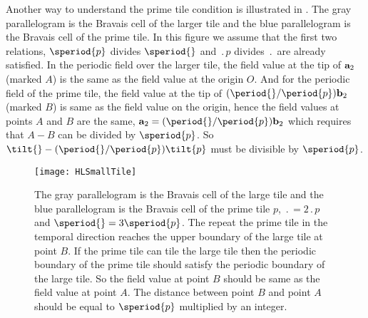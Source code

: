 \begin{description}
{Another way to understand the prime tile condition is illustrated in
. The gray parallelogram is the Bravais cell of
the larger tile and the blue parallelogram is the Bravais cell of the
prime tile. In this figure we assume that the first two relations,
$\speriod{p}$ divides $\speriod{}$ and $\period{p}$ divides $\period{}$
are already satisfied. In the periodic field over the larger tile, the
field value at the tip of  ${\bf a}_2$ (marked $A$) is the same as the
field value at the origin $O$. And for the periodic field of the prime
tile, the field value at the tip of  $(\period{}/\period{p}){\bf b}_2$
(marked $B$) is same as the field value on the origin, hence the field
values at points $A$ and $B$ are the same, ${\bf
a}_2=(\period{}/\period{p}){\bf b}_2$ which requires that $A-B$ can be
divided by $\speriod{p}$. So $\tilt{} - (\period{}/\period{p})
\tilt{p}$ must be divisible by $\speriod{p}$.
}

\begin{figure}
  \centering
\texttt{[image: HLSmallTile]}
  \caption{\label{fig:HLSmallTile}
The gray parallelogram is the Bravais cell of the large tile and the blue
parallelogram is the Bravais cell of the prime tile $p$,
$\period{} = 2 \period{p}$ and $\speriod{} = 3
\speriod{p}$. The repeat the prime tile in the temporal direction
reaches the upper boundary of the large tile at point $B$. If the
prime tile can tile the large tile then the periodic boundary of the
prime tile should satisfy the periodic boundary of the large tile. So the
field value at point $B$ should be same as the field value at point $A$.
The distance between point $B$ and point $A$ should be equal to
$\speriod{p}$ multiplied by an integer.
}
\end{figure}


\end{description}
